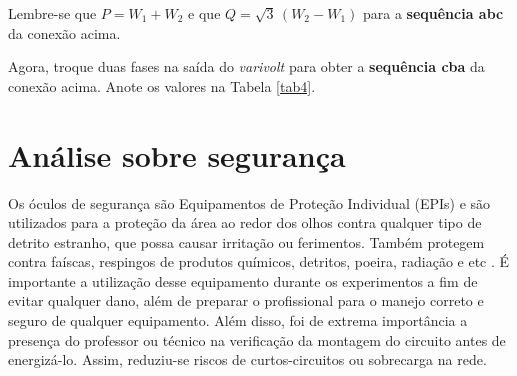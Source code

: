 \documentclass[a4paper,12pt,oneside,openany,table,xcdraw]{article}
\begin{document}
Lembre-se que $P = W_1 + W_2$ e que $Q=\sqrt{3}\, (W_2 - W_1)$ para a \textbf{sequência abc} da conexão acima.

Agora, troque duas fases na saída do \textit{varivolt} para obter a \textbf{sequência cba} da conexão acima. Anote os valores na Tabela \ref{tab4}.


\begin{table}[H]\scriptsize
\centering
\def\arraystretch{1.35}
\captionsetup{font=scriptsize}
 \label{tab4}
\end{table}

\section{Análise sobre segurança} %
Os óculos de segurança são Equipamentos de Proteção Individual (EPIs) e são utilizados para a proteção da área ao redor dos olhos contra qualquer tipo de detrito estranho, que possa causar irritação ou ferimentos. Também protegem contra faíscas, respingos de produtos químicos, detritos, poeira, radiação e etc \cite{safe}.
É importante a utilização desse equipamento durante os experimentos a fim de evitar qualquer dano, além de preparar o profissional para o manejo correto e seguro de qualquer equipamento.
Além disso, foi de extrema importância a presença do professor ou técnico na verificação da montagem do circuito antes de energizá-lo. Assim, reduziu-se riscos de curtos-circuitos ou sobrecarga na rede.
\end{document}
